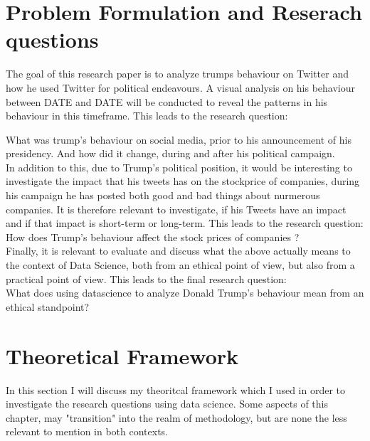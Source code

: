 \documentclass[11pt]{article}
\begin{document}
\cleardoublepage





\section{Problem Formulation and Reserach questions} \label{sec:ch1}
The goal of this research paper is to analyze  trumps behaviour on Twitter and how he used Twitter for political endeavours. A visual analysis on his behaviour between DATE and DATE will be conducted to reveal the patterns in his behaviour in this timeframe. This leads to the research question: 

\par\vspace{10pt}

What was trump's behaviour on social media, prior to his announcement of his presidency. And how did it change, during and after his political campaign.\\

In addition to this, due to Trump's political position, it would be interesting to investigate the impact that his tweets has on the stockprice of companies, during his campaign he has posted both good and bad things about nurmerous companies. It is therefore relevant to investigate, if his Tweets have an impact and if that impact is short-term or long-term. This leads to the research question:\\

How does Trump's behaviour affect the stock prices of companies ? \\

Finally, it is relevant to evaluate and discuss what the above actually means to the context of Data Science, both from an ethical point of view, but also from a practical point of view. This leads to the final research question: \\

What does using datascience to analyze Donald Trump's behaviour mean from an ethical standpoint?
 



\section{Theoretical Framework}
In this section I will discuss my theoritcal framework which I used in order to investigate the research questions using data science. Some aspects of this chapter, may "transition" into the realm of methodology, but are none the less relevant to mention in both contexts.
\end{document}
